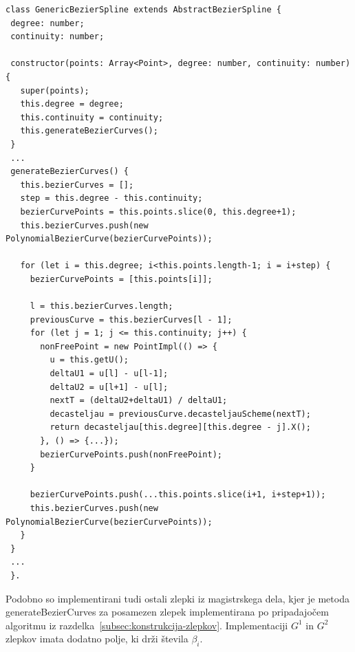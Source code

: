 \documentclass[isrm2, tisk]{fmfdelo}
\begin{document}
    \begin{lstlisting}[label={lst:zlepek}]
class GenericBezierSpline extends AbstractBezierSpline {
 degree: number;
 continuity: number;

 constructor(points: Array<Point>, degree: number, continuity: number) {
   super(points);
   this.degree = degree;
   this.continuity = continuity;
   this.generateBezierCurves();
 }
 ...
 generateBezierCurves() {
   this.bezierCurves = [];
   step = this.degree - this.continuity;
   bezierCurvePoints = this.points.slice(0, this.degree+1);
   this.bezierCurves.push(new PolynomialBezierCurve(bezierCurvePoints));

   for (let i = this.degree; i<this.points.length-1; i = i+step) {
     bezierCurvePoints = [this.points[i]];

     l = this.bezierCurves.length;
     previousCurve = this.bezierCurves[l - 1];
     for (let j = 1; j <= this.continuity; j++) {
       nonFreePoint = new PointImpl(() => {
         u = this.getU();
         deltaU1 = u[l] - u[l-1];
         deltaU2 = u[l+1] - u[l];
         nextT = (deltaU2+deltaU1) / deltaU1;
         decasteljau = previousCurve.decasteljauScheme(nextT);
         return decasteljau[this.degree][this.degree - j].X();
       }, () => {...});
       bezierCurvePoints.push(nonFreePoint);
     }

     bezierCurvePoints.push(...this.points.slice(i+1, i+step+1));
     this.bezierCurves.push(new PolynomialBezierCurve(bezierCurvePoints));
   }
 }
 ...
 }.
    \end{lstlisting}
    Podobno so implementirani tudi ostali zlepki iz magistrskega dela, kjer je metoda generateBezierCurves za posamezen zlepek implementirana po pripadajočem algoritmu iz razdelka~\ref{subsec:konstrukcija-zlepkov}.
    Implementaciji $G^1$ in $G^2$ zlepkov imata dodatno polje, ki drži števila $\beta_i$.
\end{document}
